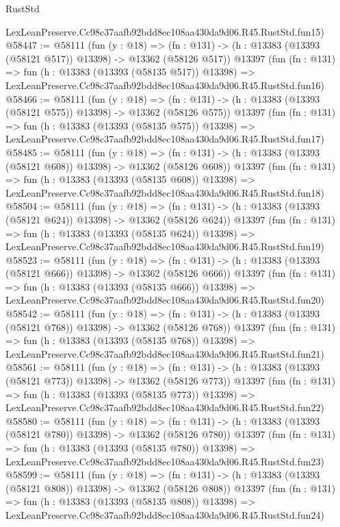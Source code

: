 \begin{lexlean}{RustStd}
\begin{coremodule}
    LexLeanPreserve.Cc98c37aafb92bdd8ec108aa430da9d06.R45.RustStd.fun15)
@58447 := @58111
    (fun (y : @18) =>
    (fn : @131) -> (h : @13383 (@13393 (@58121 @517)) @13398) -> @13362 (@58126 @517))
    @13397
    (fun (fn : @131) =>
    fun (h : @13383 (@13393 (@58135 @517)) @13398) =>
    LexLeanPreserve.Cc98c37aafb92bdd8ec108aa430da9d06.R45.RustStd.fun16)
@58466 := @58111
    (fun (y : @18) =>
    (fn : @131) -> (h : @13383 (@13393 (@58121 @575)) @13398) -> @13362 (@58126 @575))
    @13397
    (fun (fn : @131) =>
    fun (h : @13383 (@13393 (@58135 @575)) @13398) =>
    LexLeanPreserve.Cc98c37aafb92bdd8ec108aa430da9d06.R45.RustStd.fun17)
@58485 := @58111
    (fun (y : @18) =>
    (fn : @131) -> (h : @13383 (@13393 (@58121 @608)) @13398) -> @13362 (@58126 @608))
    @13397
    (fun (fn : @131) =>
    fun (h : @13383 (@13393 (@58135 @608)) @13398) =>
    LexLeanPreserve.Cc98c37aafb92bdd8ec108aa430da9d06.R45.RustStd.fun18)
@58504 := @58111
    (fun (y : @18) =>
    (fn : @131) -> (h : @13383 (@13393 (@58121 @624)) @13398) -> @13362 (@58126 @624))
    @13397
    (fun (fn : @131) =>
    fun (h : @13383 (@13393 (@58135 @624)) @13398) =>
    LexLeanPreserve.Cc98c37aafb92bdd8ec108aa430da9d06.R45.RustStd.fun19)
@58523 := @58111
    (fun (y : @18) =>
    (fn : @131) -> (h : @13383 (@13393 (@58121 @666)) @13398) -> @13362 (@58126 @666))
    @13397
    (fun (fn : @131) =>
    fun (h : @13383 (@13393 (@58135 @666)) @13398) =>
    LexLeanPreserve.Cc98c37aafb92bdd8ec108aa430da9d06.R45.RustStd.fun20)
@58542 := @58111
    (fun (y : @18) =>
    (fn : @131) -> (h : @13383 (@13393 (@58121 @768)) @13398) -> @13362 (@58126 @768))
    @13397
    (fun (fn : @131) =>
    fun (h : @13383 (@13393 (@58135 @768)) @13398) =>
    LexLeanPreserve.Cc98c37aafb92bdd8ec108aa430da9d06.R45.RustStd.fun21)
@58561 := @58111
    (fun (y : @18) =>
    (fn : @131) -> (h : @13383 (@13393 (@58121 @773)) @13398) -> @13362 (@58126 @773))
    @13397
    (fun (fn : @131) =>
    fun (h : @13383 (@13393 (@58135 @773)) @13398) =>
    LexLeanPreserve.Cc98c37aafb92bdd8ec108aa430da9d06.R45.RustStd.fun22)
@58580 := @58111
    (fun (y : @18) =>
    (fn : @131) -> (h : @13383 (@13393 (@58121 @780)) @13398) -> @13362 (@58126 @780))
    @13397
    (fun (fn : @131) =>
    fun (h : @13383 (@13393 (@58135 @780)) @13398) =>
    LexLeanPreserve.Cc98c37aafb92bdd8ec108aa430da9d06.R45.RustStd.fun23)
@58599 := @58111
    (fun (y : @18) =>
    (fn : @131) -> (h : @13383 (@13393 (@58121 @808)) @13398) -> @13362 (@58126 @808))
    @13397
    (fun (fn : @131) =>
    fun (h : @13383 (@13393 (@58135 @808)) @13398) =>
    LexLeanPreserve.Cc98c37aafb92bdd8ec108aa430da9d06.R45.RustStd.fun24)

\end{coremodule}
\end{lexlean}
